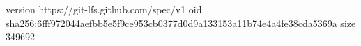version https://git-lfs.github.com/spec/v1
oid sha256:6fff972044aefbb5e5f9ce953cb0377d0d9a133153a11b74e4a4fe38cda5369a
size 349692

